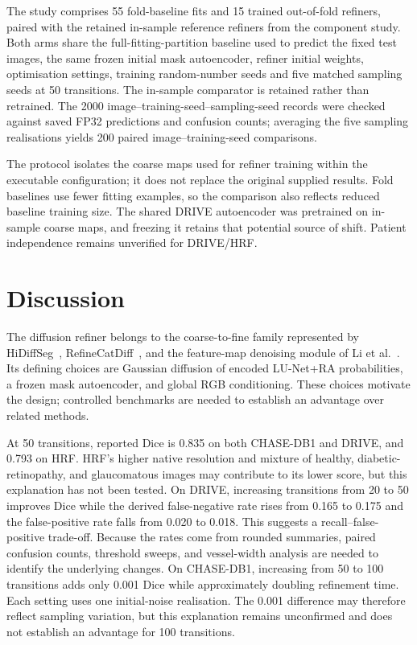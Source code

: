 \documentclass[jimaging,article,submit,pdftex,moreauthors]{Definitions/mdpi}%
\begin{document}
The study comprises 55 fold-baseline fits and 15 trained out-of-fold refiners, paired with the retained in-sample reference refiners from the component study. Both arms share the full-fitting-partition baseline used to predict the fixed test images, the same frozen initial mask autoencoder, refiner initial weights, optimisation settings, training random-number seeds and five matched sampling seeds at 50 transitions. The in-sample comparator is retained rather than retrained. The 2000 image--training-seed--sampling-seed records were checked against saved FP32 predictions and confusion counts; averaging the five sampling realisations yields 200 paired image--training-seed comparisons.

The protocol isolates the coarse maps used for refiner training within the executable configuration; it does not replace the original supplied results. Fold baselines use fewer fitting examples, so the comparison also reflects reduced baseline training size. The shared DRIVE autoencoder was pretrained on in-sample coarse maps, and freezing it retains that potential source of shift. Patient independence remains unverified for DRIVE/HRF.

\section{Discussion}

\label{sec:discussion}



The diffusion refiner belongs to the coarse-to-fine family represented by HiDiffSeg~\cite{HiDiffSeg}, RefineCatDiff~\cite{RefineCatDiff}, and the feature-map denoising module of Li et al.~\cite{DiffusionFMD}. Its defining choices are Gaussian diffusion of encoded LU-Net+RA probabilities, a frozen mask autoencoder, and global RGB conditioning. These choices motivate the design; controlled benchmarks are needed to establish an advantage over related methods.



At 50 transitions, reported Dice is 0.835 on both CHASE-DB1 and DRIVE, and 0.793 on HRF. HRF's higher native resolution and mixture of healthy, diabetic-retinopathy, and glaucomatous images may contribute to its lower score, but this explanation has not been tested. On DRIVE, increasing transitions from 20 to 50 improves Dice while the derived false-negative rate rises from 0.165 to 0.175 and the false-positive rate falls from 0.020 to 0.018. This suggests a recall--false-positive trade-off. Because the rates come from rounded summaries, paired confusion counts, threshold sweeps, and vessel-width analysis are needed to identify the underlying changes. On CHASE-DB1, increasing from 50 to 100 transitions adds only 0.001 Dice while approximately doubling refinement time. Each setting uses one initial-noise realisation. The 0.001 difference may therefore reflect sampling variation, but this explanation remains unconfirmed and does not establish an advantage for 100 transitions.
\end{document}

